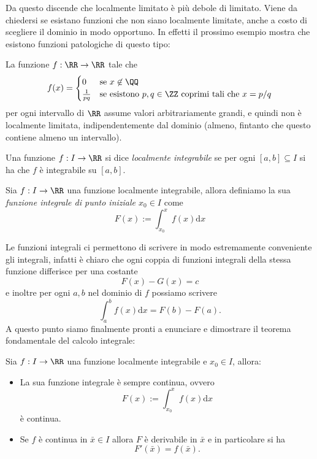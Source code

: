 \documentclass[11pt]{scrartcl}
\newcommand{\dif}{\text{d}}
\begin{document}
	Da questo discende che localmente limitato è più debole di limitato. Viene da chiedersi se esistano funzioni che non siano localmente limitate, anche a costo di scegliere il dominio in modo opportuno. In effetti il prossimo esempio mostra che esistono funzioni patologiche di questo tipo:
	\begin{example}
		La funzione $f:\RR\to\RR$ tale che
		$$f(x)=\begin{cases}
			0 & \text{se $x\not\in \QQ$} \\
			\frac{1}{pq} & \text{se esistono $p,q\in\ZZ$ coprimi tali che $x=p/q$} 
		\end{cases}$$
		per ogni intervallo di $\RR$ assume valori arbitrariamente grandi, e quindi non è localmente limitata, indipendentemente dal dominio (almeno, fintanto che questo contiene almeno un intervallo).
	\end{example}
	\begin{definition}
		Una funzione $f:I\to\RR$ si dice \textit{localmente integrabile} se per ogni $[a,b]\subseteq I$ si ha che $f$ è integrabile su $[a,b]$.
	\end{definition}
	\begin{definition}
		Sia $f:I\to\RR$ una funzione localmente integrabile, allora definiamo la sua \textit{funzione integrale di punto iniziale $x_0\in I$} come
		$$F(x):=\int_{x_0}^x f(x)\dif x$$
	\end{definition}
	Le funzioni integrali ci permettono di scrivere in modo estremamente conveniente gli integrali, infatti è chiaro che ogni coppia di funzioni integrali della stessa funzione differisce per una costante
	$$F(x)-G(x)=c$$
	e inoltre per ogni $a,b$ nel dominio di $f$ possiamo scrivere
	$$\int_a^b f(x)\dif x=F(b)-F(a).$$
	A questo punto siamo finalmente pronti a enunciare e dimostrare il teorema fondamentale del calcolo integrale:
	\begin{theorem}
		Sia $f:I\to \RR$ una funzione localmente integrabile e $x_0\in I$, allora:
		\begin{itemize}
			\item La sua funzione integrale è sempre continua, ovvero
			$$F(x):=\int_{x_0}^x f(x)\dif x $$
			è continua.
			\item Se $f$ è continua in $\bar{x}\in I$ allora $F$ è derivabile in $\bar{x}$ e in particolare si ha
			$$F'(\bar{x})=f(\bar{x}).$$
		\end{itemize}
	\end{theorem}
\end{document}
